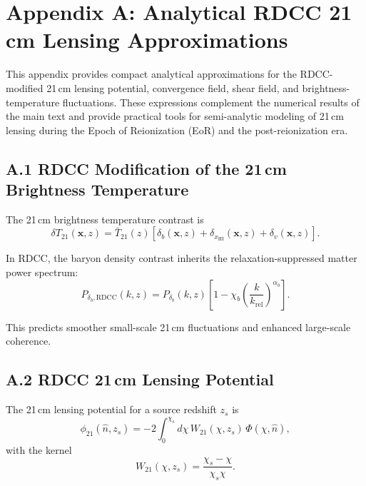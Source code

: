 \documentclass[11pt,a4paper]{article}
\begin{document}
\section*{Appendix A: Analytical RDCC 21\,cm Lensing Approximations}

This appendix provides compact analytical approximations for the RDCC-modified 21\,cm
lensing potential, convergence field, shear field, and brightness-temperature fluctuations. These
expressions complement the numerical results of the main text and provide practical tools for
semi-analytic modeling of 21\,cm lensing during the Epoch of Reionization (EoR) and the
post-reionization era.

\subsection*{A.1 RDCC Modification of the 21\,cm Brightness Temperature}

The 21\,cm brightness temperature contrast is
\begin{equation}
\delta T_{21}(\mathbf{x},z)
=
\bar{T}_{21}(z)
\left[
\delta_{b}(\mathbf{x},z)
+
\delta_{x_{\mathrm{HI}}}(\mathbf{x},z)
+
\delta_{v}(\mathbf{x},z)
\right].
\end{equation}

In RDCC, the baryon density contrast inherits the relaxation-suppressed matter power spectrum:
\begin{equation}
P_{\delta_{b},\mathrm{RDCC}}(k,z)
=
P_{\delta_{b}}(k,z)
\left[
1
-
\chi_{b}
\left(
\frac{k}{k_{\mathrm{rel}}}
\right)^{\alpha_{b}}
\right].
\end{equation}

This predicts smoother small-scale 21\,cm fluctuations and enhanced large-scale coherence.

\subsection*{A.2 RDCC 21\,cm Lensing Potential}

The 21\,cm lensing potential for a source redshift $z_{s}$ is
\begin{equation}
\phi_{21}(\hat{n},z_{s})
=
-2
\int_{0}^{\chi_{s}}
d\chi\,
W_{21}(\chi,z_{s})\,
\Phi(\chi,\hat{n}),
\end{equation}
with the kernel
\begin{equation}
W_{21}(\chi,z_{s})
=
\frac{\chi_{s}-\chi}{\chi_{s}\chi}.
\end{equation}
\end{document}
